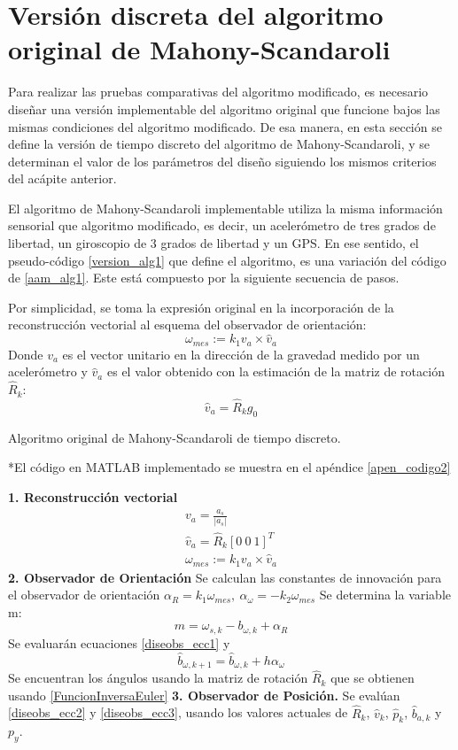 \documentclass[10pt]{report}
\numberwithin{equation}{chapter}
\numberwithin{algorithm}{chapter}
\begin{document}
\section{Versión discreta del algoritmo original de Mahony-Scandaroli}
Para realizar las pruebas comparativas del algoritmo modificado, es necesario diseñar una versión implementable del algoritmo original que funcione bajos las mismas condiciones del algoritmo modificado. De esa manera, en esta sección se define la versión de tiempo discreto del algoritmo de Mahony-Scandaroli, y se determinan el valor de los parámetros del diseño siguiendo los mismos criterios del acápite anterior. \par
El algoritmo de Mahony-Scandaroli implementable utiliza la misma información sensorial que algoritmo modificado, es decir, un acelerómetro de tres grados de libertad, un giroscopio de 3 grados de libertad y un GPS. En ese sentido, el pseudo-código \ref{version_alg1} que define el algoritmo, es una variación del código de \ref{aam_alg1}. Este está compuesto por la siguiente secuencia de pasos.\par
Por simplicidad, se toma la expresión original en la incorporación de la reconstrucción vectorial al esquema del observador de orientación:
\begin{equation}\label{version_ecc1}
\omega_{mes}:=k_1v_a\times \hat{v}_a
\end{equation}
Donde $v_a$ es el vector unitario en la dirección de la gravedad medido por un acelerómetro y $\hat{v}_a$ es el valor obtenido con la estimación de la matriz de rotación $\hat{R}_k$:
\begin{equation*}
\hat{v}_a=\hat{R}_kg_0
\end{equation*}
\begin{algorithm}[ht]
\caption{Algoritmo original de Mahony-Scandaroli de tiempo discreto.}\scriptsize{*El código en MATLAB implementado se muestra en el apéndice \ref{apen_codigo2}}\footnotesize
\label{version_alg1}
\begin{algorithmic}
\State\textbf{1. Reconstrucción vectorial}
\State \begin{gather*}
v_{a}=\frac{a_s}{|a_s|}\\
\hat{v}_{a}=\hat{R}_k[0~0~1]^T\\
\omega_{mes}:=k_1v_a\times \hat{v}_a
\end{gather*}
\State\textbf{2. Observador de Orientación}
\State Se calculan las constantes de innovación para el observador de orientación $\alpha_R=k_1\omega_{mes}, ~ \alpha_\omega=-k_2\omega_{mes}$
\State Se determina la variable m: $$m=\omega_{s,k}-b_{\omega,k}+\alpha_R$$
\State Se evaluarán ecuaciones \eqref{diseobs_ecc1} y $$\hat{b}_{\omega,k+1}=\hat{b}_{\omega,k}+h\alpha_\omega$$ 
\State Se encuentran los ángulos usando la matriz de rotación $\hat{R}_k$ que se obtienen usando \eqref{FuncionInversaEuler}
\State\textbf{3. Observador de Posición.}
\State Se evalúan \eqref{diseobs_ecc2} y \eqref{diseobs_ecc3}, usando los valores actuales de $\hat{R}_k$, $\hat{v}_k$, $\hat{p}_k$, $\hat{b}_{a,k}$ y $p_y$.
\end{algorithmic}
\end{algorithm}\par
\end{document}
